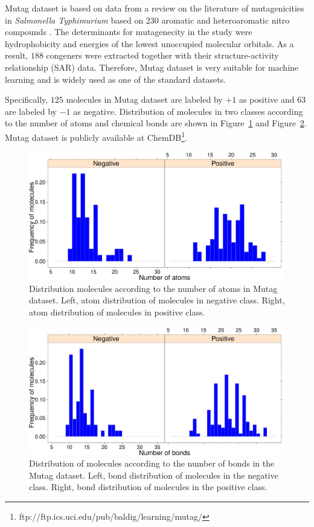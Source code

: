 \documentclass[english]{tktltiki}
\begin{document}
Mutag dataset is based on data from a review on the literature of mutagenicities in {\slshape Salmonella Typhimurium} based on $230$ aromatic and heteroaromatic nitro compounds \cite{debnath91}. The determinants for mutagenecity in the study were hydrophobicity and energies of the lowest unoccupied molecular orbitals. As a result, $188$ congeners were extracted together with their structure-activity relationship (SAR) data. Therefore, Mutag dataset is very suitable for machine learning and is widely used as one of the standard datasets. 

Specifically, $125$ molecules in Mutag dataset are labeled by $+1$ as positive and \(63\) are labeled by $-1$ as negative. Distribution of molecules in two classes according to the number of atoms and chemical bonds are shown in Figure~\ref{mutag_atom} and Figure~\ref{mutag_bond}. Mutag dataset is publicly available at ChemDB\footnote{ftp://ftp.ics.uci.edu/pub/baldig/learning/mutag/}.

\begin{figure}[h]
\begin{center}
\includegraphics[width=0.9\columnwidth]{./plots/mutag_atom_statistics.pdf}
\caption[Atom distribution of Mutag dataset.]{Distribution molecules according to the number of atoms in Mutag dataset. Left, atom distribution of molecules in negative class. Right, atom distribution of molecules in positive class.}
\label{mutag_atom}
\end{center}
\end{figure}

\begin{figure}[h]
\begin{center}
\includegraphics[width=0.9\columnwidth]{./plots/mutag_bond_statistics.pdf}
\caption[Bond distribution of Mutag dataset.]{Distribution of molecules according to the number of bonds in the Mutag dataset. Left, bond distribution of molecules in the negative class. Right, bond distribution of molecules in the positive class.}
\label{mutag_bond}
\end{center}
\end{figure}
\end{document}
